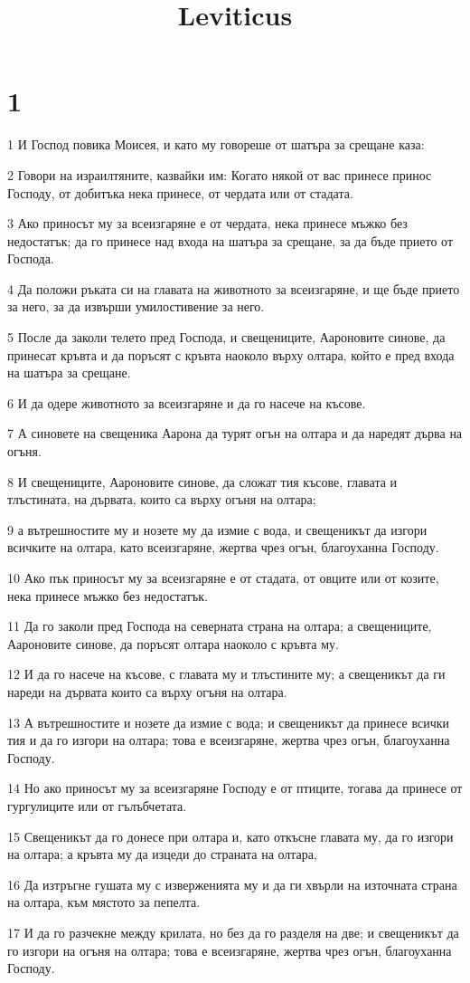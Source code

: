 

\title{Leviticus}


\chapter{1}

\par 1 И Господ повика Моисея, и като му говореше от шатъра за срещане каза:
\par 2 Говори на израилтяните, казвайки им: Когато някой от вас принесе принос Господу, от добитъка нека принесе, от чердата или от стадата.
\par 3 Ако приносът му за всеизгаряне е от чердата, нека принесе мъжко без недостатък; да го принесе над входа на шатъра за срещане, за да бъде прието от Господа.
\par 4 Да положи ръката си на главата на животното за всеизгаряне, и ще бъде прието за него, за да извърши умилостивение за него.
\par 5 После да заколи телето пред Господа, и свещениците, Аароновите синове, да принесат кръвта и да поръсят с кръвта наоколо върху олтара, който е пред входа на шатъра за срещане.
\par 6 И да одере животното за всеизгаряне и да го насече на късове.
\par 7 А синовете на свещеника Аарона да турят огън на олтара и да наредят дърва на огъня.
\par 8 И свещениците, Аароновите синове, да сложат тия късове, главата и тлъстината, на дървата, които са върху огъня на олтара;
\par 9 а вътрешностите му и нозете му да измие с вода, и свещеникът да изгори всичките на олтара, като всеизгаряне, жертва чрез огън, благоуханна Господу.
\par 10 Ако пък приносът му за всеизгаряне е от стадата, от овците или от козите, нека принесе мъжко без недостатък.
\par 11 Да го заколи пред Господа на северната страна на олтара; а свещениците, Аароновите синове, да поръсят олтара наоколо с кръвта му.
\par 12 И да го насече на късове, с главата му и тлъстините му; а свещеникът да ги нареди на дървата които са върху огъня на олтара.
\par 13 А вътрешностите и нозете да измие с вода; и свещеникът да принесе всички тия и да го изгори на олтара; това е всеизгаряне, жертва чрез огън, благоуханна Господу.
\par 14 Но ако приносът му за всеизгаряне Господу е от птиците, тогава да принесе от гургулиците или от гълъбчетата.
\par 15 Свещеникът да го донесе при олтара и, като откъсне главата му, да го изгори на олтара; а кръвта му да изцеди до страната на олтара,
\par 16 Да изтръгне гушата му с изверженията му и да ги хвърли на източната страна на олтара, към мястото за пепелта.
\par 17 И да го разчекне между крилата, но без да го разделя на две; и свещеникът да го изгори на огъня на олтара; това е всеизгаряне, жертва чрез огън, благоуханна Господу.

